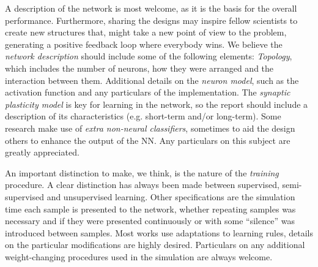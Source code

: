 A description of the network is most welcome, as it is the basis for the overall performance. Furthermore, sharing the designs may inspire fellow scientists to create new structures that, might take a new point of view to the problem, generating a positive feedback loop where everybody wins. We believe the \emph{network description} should include some of the following elements:
    \textit{Topology}, %
    which includes the number of neurons, how they were arranged and the interaction between them. 
    Additional details on the \textit{neuron model}, %
    such as the activation function and any particulars of the implementation.
    The \textit{synaptic plasticity model} %
    is key for learning in the network, so the report should include a description of its characteristics (e.g. short-term and/or long-term).
      Some research make use of \emph{extra non-neural classifiers}, sometimes to aid the design others to enhance the output of the NN. Any particulars on this subject are greatly appreciated.


An important distinction to make, we think, is the nature of the \emph{training} procedure. A clear distinction has always been made between supervised, semi-supervised and unsupervised learning. Other specifications are the simulation time each sample is presented to the network, whether repeating samples was necessary and if they were presented continuously or with some ``silence'' was introduced between samples. Most works use adaptations to learning rules, details on the particular modifications are highly desired. Particulars on any additional weight-changing procedures used in the simulation are always welcome.

